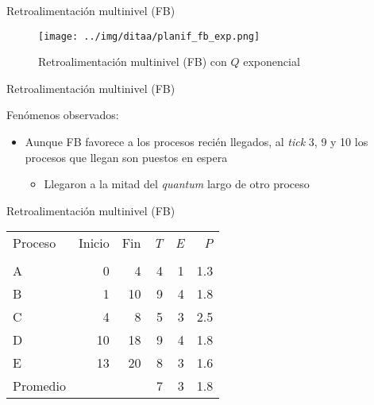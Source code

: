 \documentclass[presentation]{beamer}
\begin{document}
\begin{frame}[label={sec:org1d1a54a}]{Retroalimentación multinivel (FB)}
\begin{figure}[htbp]
\centering
\texttt{[image: ../img/ditaa/planif\_fb\_exp.png]}
\caption{Retroalimentación multinivel (FB) con \(Q\) exponencial}
\end{figure}
\end{frame}

\begin{frame}[label={sec:orgf393115}]{Retroalimentación multinivel (FB)}
\begin{center}
Fenómenos observados:
\end{center}
\begin{itemize}
\item Aunque FB favorece a los procesos recién llegados, al \emph{tick} 3, 9 y
10 los procesos que llegan son puestos en espera
\begin{itemize}
\item Llegaron a la mitad del \emph{quantum} largo de otro proceso
\end{itemize}
\end{itemize}
\end{frame}

\begin{frame}[label={sec:orgc8e5308}]{Retroalimentación multinivel (FB)}
\begin{center}
\begin{tabular}{lrrrrr}
Proceso & Inicio & Fin & \emph{T} & \emph{E} & \emph{P}\\
 &  &  &  &  & \\
\hline
A & 0 & 4 & 4 & 1 & 1.3\\
B & 1 & 10 & 9 & 4 & 1.8\\
C & 4 & 8 & 5 & 3 & 2.5\\
D & 10 & 18 & 9 & 4 & 1.8\\
E & 13 & 20 & 8 & 3 & 1.6\\
\hline
Promedio &  &  & 7 & 3 & 1.8\\
\end{tabular}
\end{center}
\end{frame}
\end{document}
